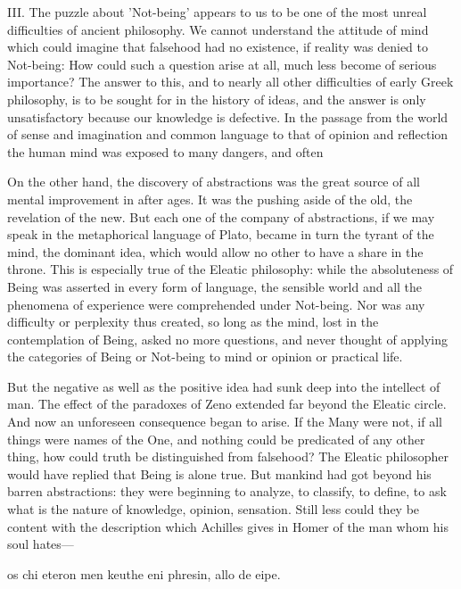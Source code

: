 \documentclass[11pt,letter]{article}
\begin{document}
\par  III. The puzzle about 'Not-being' appears to us to be one of the most unreal difficulties of ancient philosophy. We cannot understand the attitude of mind which could imagine that falsehood had no existence, if reality was denied to Not-being: How could such a question arise at all, much less become of serious importance? The answer to this, and to nearly all other difficulties of early Greek philosophy, is to be sought for in the history of ideas, and the answer is only unsatisfactory because our knowledge is defective. In the passage from the world of sense and imagination and common language to that of opinion and reflection the human mind was exposed to many dangers, and often
 
\par  On the other hand, the discovery of abstractions was the great source of all mental improvement in after ages. It was the pushing aside of the old, the revelation of the new. But each one of the company of abstractions, if we may speak in the metaphorical language of Plato, became in turn the tyrant of the mind, the dominant idea, which would allow no other to have a share in the throne. This is especially true of the Eleatic philosophy: while the absoluteness of Being was asserted in every form of language, the sensible world and all the phenomena of experience were comprehended under Not-being. Nor was any difficulty or perplexity thus created, so long as the mind, lost in the contemplation of Being, asked no more questions, and never thought of applying the categories of Being or Not-being to mind or opinion or practical life.

\par  But the negative as well as the positive idea had sunk deep into the intellect of man. The effect of the paradoxes of Zeno extended far beyond the Eleatic circle. And now an unforeseen consequence began to arise. If the Many were not, if all things were names of the One, and nothing could be predicated of any other thing, how could truth be distinguished from falsehood? The Eleatic philosopher would have replied that Being is alone true. But mankind had got beyond his barren abstractions: they were beginning to analyze, to classify, to define, to ask what is the nature of knowledge, opinion, sensation. Still less could they be content with the description which Achilles gives in Homer of the man whom his soul hates—

\par  os chi eteron men keuthe eni phresin, allo de eipe.
\end{document}
